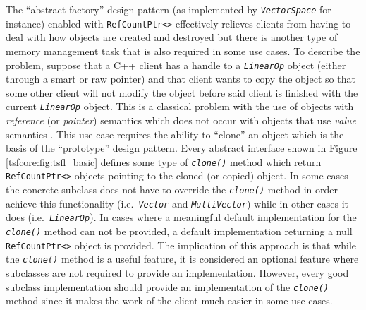 The ``abstract factory'' design pattern (as implemented by
\texttt{\textit{VectorSpace}} for instance) enabled with \texttt{RefCountPtr<>}
effectively relieves clients from having to deal with how objects are
created and destroyed but there is another type of memory management
task that is also required in some use cases.  To describe the
problem, suppose that a C++ client has a handle to a
\texttt{\textit{LinearOp}} object (either through a smart or raw
pointer) and that client wants to copy the object so that some other
client will not modify the object before said client is finished with
the current \texttt{\textit{LinearOp}} object.  This is a classical
problem with the use of objects with {\em reference} (or {\em
pointer}) semantics which does not occur with objects that use {\em
value} semantics \cite{ref:stroustrup_1997}.  This use case requires
the ability to ``clone'' an object which is the basis of the
``prototype'' design pattern.  Every abstract interface shown in
Figure \ref{tsfcore:fig:tsfl_basic} defines some type of
\texttt{\textit{clone()}} method which return
\texttt{RefCountPtr<>} objects pointing to the cloned (or copied)
object.  In some cases the concrete subclass does not have to
override the \texttt{\textit{clone()}} method in order achieve this
functionality (i.e.~\texttt{\textit{Vector}} and
\texttt{\textit{Multi\-Vector}}) while in other cases it does
(i.e.~\texttt{\textit{LinearOp}}).  In cases
where a meaningful default implementation for the
\texttt{\textit{clone()}} method can not be provided, a default implementation
returning a null \texttt{RefCountPtr<>} object is provided.
The implication of this approach is that while the \texttt{\textit{clone()}}
method is a useful feature, it is considered an optional feature where
subclasses are not required to provide an implementation.  However,
every good subclass implementation should provide an implementation of
the \texttt{\textit{clone()}} method since it makes the work of the client much
easier in some use cases.
	
